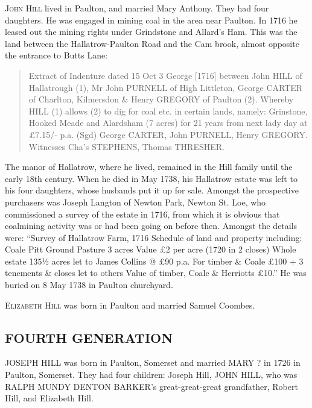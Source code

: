 \textsc{John Hill} lived in Paulton, and married Mary Anthony. They had four daughters.  He was engaged in mining coal in the area near Paulton.  In 1716 he leased out the mining rights under Grindstone and Allard’s Ham. This was the land between the Hallatrow-Paulton Road and the Cam brook, almost opposite the entrance to Butts Lane:
\begin{quotation}
Extract of Indenture dated 15 Oct 3 George [1716] between John HILL of Hallatrough (1), Mr John PURNELL of High Littleton, George CARTER of Charlton, Kilmersdon \& Henry GREGORY of Paulton (2). Whereby HILL (1) allows (2) to dig for coal etc. in certain lands, namely: Grinstone, Hooked Meade and Alardsham (7 acres) for 21 years from next lady day at £7.15/- p.a. (Sgd) George CARTER, John PURNELL, Henry GREGORY. Witnesses Cha’s STEPHENS, Thomas THRESHER.
\end{quotation}
The manor of Hallatrow, where he lived, remained in the Hill family until the early 18th century. When he died in May 1738,  his Hallatrow estate was left to his four daughters, whose husbands put it up for sale. Amongst the prospective purchasers was Joseph Langton of Newton Park, Newton St. Loe, who commissioned a survey of the estate in 1716, from which it is obvious that coalmining activity was or had been going on before then. Amongst the details were: ``Survey of Hallatrow Farm, 1716 Schedule of land and property including: Coale Pitt Ground Pasture 3 acres Value £2 per acre (1720 in 2 closes) Whole estate 135½ acres let to James Collins @ £90 p.a. For timber \& Coale £100 + 3 tenements \& closes let to others Value of timber, Coale \& Herriotts £10.''
He was buried on 8 May 1738 in Paulton churchyard.

\textsc{Elizabeth Hill}  was born in Paulton and married Samuel Coombes.

\subsection{FOURTH GENERATION}

\uppercase{Joseph Hill} was born in Paulton, Somerset and married \uppercase{Mary ?} in 1726 in Paulton, Somerset. They had four children: Joseph Hill, \uppercase{John Hill}, who was \uppercase{Ralph Mundy Denton Barker}'s great-great-great grandfather, Robert Hill, and Elizabeth Hill.

